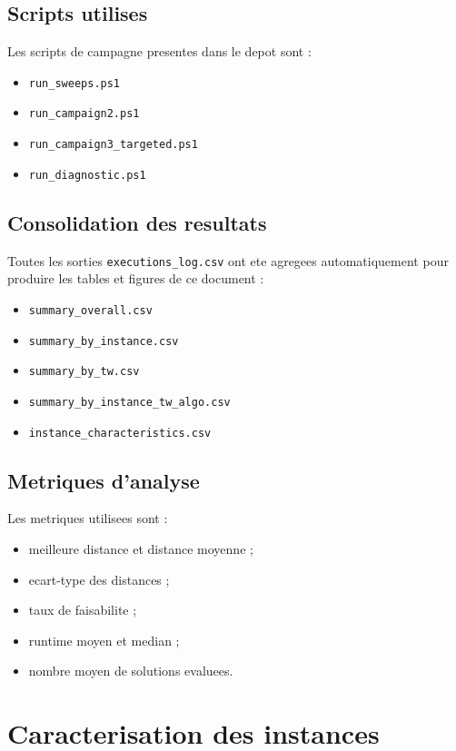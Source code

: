 \documentclass[12pt,a4paper]{report}
\begin{document}
\section{Scripts utilises}
Les scripts de campagne presentes dans le depot sont :
\begin{itemize}[leftmargin=1.2cm]
  \item \texttt{run\_sweeps.ps1}
  \item \texttt{run\_campaign2.ps1}
  \item \texttt{run\_campaign3\_targeted.ps1}
  \item \texttt{run\_diagnostic.ps1}
\end{itemize}

\section{Consolidation des resultats}
Toutes les sorties \texttt{executions\_log.csv} ont ete agregees automatiquement
pour produire les tables et figures de ce document :
\begin{itemize}[leftmargin=1.2cm]
  \item \texttt{summary\_overall.csv}
  \item \texttt{summary\_by\_instance.csv}
  \item \texttt{summary\_by\_tw.csv}
  \item \texttt{summary\_by\_instance\_tw\_algo.csv}
  \item \texttt{instance\_characteristics.csv}
\end{itemize}

\section{Metriques d'analyse}
Les metriques utilisees sont :
\begin{itemize}[leftmargin=1.2cm]
  \item meilleure distance et distance moyenne ;
  \item ecart-type des distances ;
  \item taux de faisabilite ;
  \item runtime moyen et median ;
  \item nombre moyen de solutions evaluees.
\end{itemize}

\chapter{Caracterisation des instances}
\end{document}
